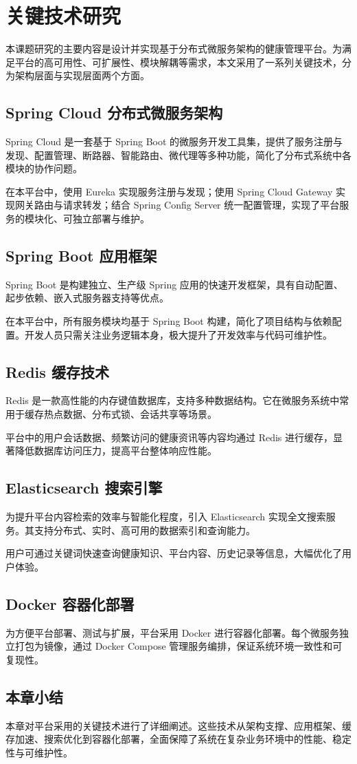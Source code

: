\section{关键技术研究}

本课题研究的主要内容是设计并实现基于分布式微服务架构的健康管理平台。为满足平台的高可用性、可扩展性、模块解耦等需求，本文采用了一系列关键技术，分为架构层面与实现层面两个方面。

\subsection{Spring Cloud 分布式微服务架构}

Spring Cloud 是一套基于 Spring Boot 的微服务开发工具集，提供了服务注册与发现、配置管理、断路器、智能路由、微代理等多种功能，简化了分布式系统中各模块的协作问题。

在本平台中，使用 Eureka 实现服务注册与发现；使用 Spring Cloud Gateway 实现网关路由与请求转发；结合 Spring Config Server 统一配置管理，实现了平台服务的模块化、可独立部署与维护。

\subsection{Spring Boot 应用框架}

Spring Boot 是构建独立、生产级 Spring 应用的快速开发框架，具有自动配置、起步依赖、嵌入式服务器支持等优点。

在本平台中，所有服务模块均基于 Spring Boot 构建，简化了项目结构与依赖配置。开发人员只需关注业务逻辑本身，极大提升了开发效率与代码可维护性。

\subsection{Redis 缓存技术}

Redis 是一款高性能的内存键值数据库，支持多种数据结构。它在微服务系统中常用于缓存热点数据、分布式锁、会话共享等场景。

平台中的用户会话数据、频繁访问的健康资讯等内容均通过 Redis 进行缓存，显著降低数据库访问压力，提高平台整体响应性能。

\subsection{Elasticsearch 搜索引擎}

为提升平台内容检索的效率与智能化程度，引入 Elasticsearch 实现全文搜索服务。其支持分布式、实时、高可用的数据索引和查询能力。

用户可通过关键词快速查询健康知识、平台内容、历史记录等信息，大幅优化了用户体验。

\subsection{Docker 容器化部署}

为方便平台部署、测试与扩展，平台采用 Docker 进行容器化部署。每个微服务独立打包为镜像，通过 Docker Compose 管理服务编排，保证系统环境一致性和可复现性。

\subsection{本章小结}

本章对平台采用的关键技术进行了详细阐述。这些技术从架构支撑、应用框架、缓存加速、搜索优化到容器化部署，全面保障了系统在复杂业务环境中的性能、稳定性与可维护性。
